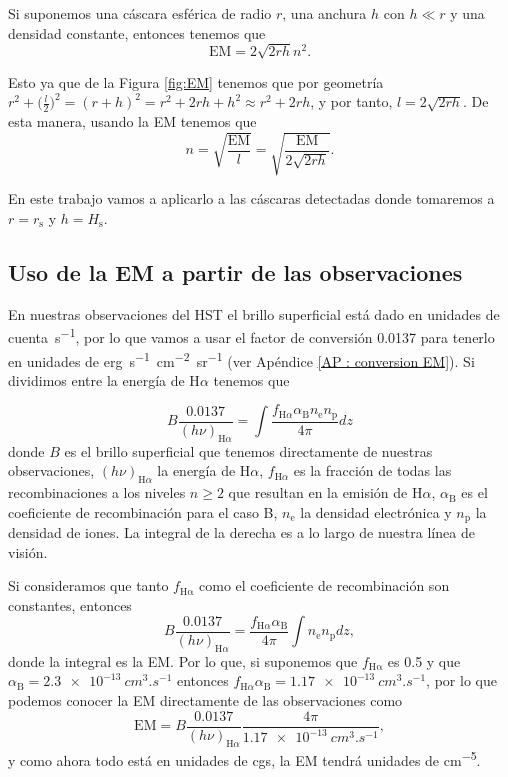 \documentclass{book}
\begin{document}
Si suponemos una cáscara esférica de radio $r$, una anchura $h$ con  $h\ll r$ y una densidad constante, entonces tenemos que
\begin{equation}
\mathrm{EM}=2\sqrt{2rh}n^2.\end{equation}

Esto ya que de la Figura \ref{fig:EM} tenemos que por geometría $r^2+\Big(\frac{l}{2}\Big)^2=(r+h)^2=r^2+2rh+h^2\approx r^2+2rh$, y por tanto, $ l=2\sqrt{2rh}$. De esta manera, usando la EM tenemos que \begin{equation}n=\sqrt{\frac{\mathrm{EM}}{l}}=\sqrt{\frac{\mathrm{EM}}{2\sqrt{2rh}}}.
\end{equation} 

En este trabajo vamos a aplicarlo a las cáscaras detectadas donde tomaremos a $r=r_\mathrm{s}$ y $h=H_\mathrm{s}$.

\subsection{Uso de la EM a partir de las observaciones} \label{Subsec : EM}

En nuestras observaciones del HST el brillo superficial está dado en unidades de \unit{cuenta.s^{-1}}, por lo que vamos a usar el factor de conversión 0.0137 para tenerlo en unidades de \unit{erg.s^{-1}.cm^{-2}.sr^{-1}} (ver Apéndice \ref{AP : conversion EM}). Si dividimos entre la energía de H$\alpha$ tenemos que

\begin{equation}
    B\frac{0.0137}{(h\nu)_{\mathrm{H}\alpha}}=\int \frac{f_{\mathrm{H}\alpha}\alpha_\mathrm{B} n_\mathrm{e} n_\mathrm{p}}{4\pi} dz
\end{equation}
donde $B$ es el brillo superficial que tenemos directamente de nuestras observaciones, $(h\nu)_{\mathrm{H}\alpha}$ la energía de H$\alpha$, $f_{\mathrm{H}\alpha}$ es la fracción de todas las recombinaciones a los niveles $n\geq 2$ que resultan en la emisión de H$\alpha$, $\alpha_\mathrm{B}$ es el coeficiente de recombinación para el caso B, $n_\mathrm{e}$ la densidad electrónica y $n_\mathrm{p}$ la densidad de iones. La integral de la derecha es a lo largo de nuestra línea de visión.

Si consideramos que tanto $f_\mathrm{H\alpha}$ como el coeficiente de recombinación son constantes, entonces
\begin{equation}
    B\frac{0.0137}{(h\nu)_{\mathrm{H}\alpha}}=\frac{f_{\mathrm{H}\alpha}\alpha_\mathrm{B}}{4\pi}\int n_\mathrm{e} n_\mathrm{p} dz,
\end{equation}
donde la integral es la EM. Por lo que, si suponemos que $f_\mathrm{H\alpha}$ es 0.5 y que $\alpha_\mathrm{B}=\SI{2.3e-13}{cm^{3}.s^{-1}}$ entonces  $f_{\mathrm{H}\alpha}\alpha_\mathrm{B}=\SI{1.17e-13}{cm^3.s^{-1}}$, por lo que podemos conocer la EM directamente de las observaciones como
\begin{equation}
    \mathrm{EM} = B\frac{0.0137}{(h\nu)_{\mathrm{H}\alpha}}\frac{4\pi}{\SI{1.17e-13}{cm^3.s^{-1}}},
\end{equation}
y como ahora todo está en unidades de cgs, la EM tendrá unidades de \unit{cm^{-5}}.\\
\end{document}
